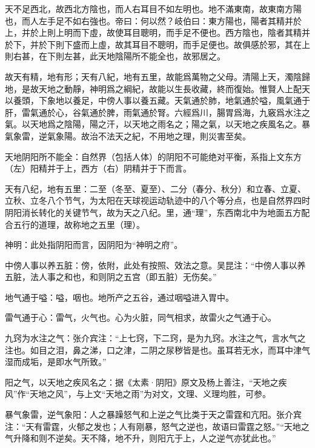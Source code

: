 \documentclass[12pt]{ctexbook}
\begin{document}

\begin{yuanwen}
天不足西北，故西北方陰也，而人右耳目不如左明也。地不滿東南，故東南方陽也，而人左手足不如右強也。帝曰：何以然？岐伯曰：東方陽也，陽者其精并於上，并於上則上明而下虛，故使耳目聰明，而手足不便也。西方陰也，陰者其精并於下，并於下則下盛而上虛，故其耳目不聰明，而手足便也。故俱感於邪，其在上則右甚，在下則左甚，此天地陰陽所不能全也，故邪居之。

故天有精，地有形；天有八紀，地有五里，故能爲萬物之父母。清陽上天，濁陰歸地，是故天地之動靜，神明爲之綱紀，故能以生長收藏，終而復始。惟賢人上配天以養頭，下象地以養足，中傍人事以養五藏。天氣通於肺，地氣通於嗌，風氣通于肝，雷氣通於心，谷氣通於脾，雨氣通於腎。六經爲川，腸胃爲海，九竅爲水注之氣。以天地爲之陰陽，陽之汗，以天地之雨名之；陽之氣，以天地之疾風名之。暴氣象雷，逆氣象陽。故治不法天之紀，不用地之理，則災害至矣。
\end{yuanwen}


\begin{jiaozhu}
  \item 天地阴阳所不能全：自然界（包括人体）的阴阳不可能绝对平衡，系指上文东方（左）阳精并于上，西方（右）阴精并于下而言。
  \item 天有八纪，地有五里：二至（冬至、夏至）、二分（春分、秋分）和立春、立夏、立秋、立冬八个节气，为太阳在天球视运动轨迹中的八个等分点，也是自然界四时阴阳消长转化的关键节气，故为天之八纪。里，通“理”，东西南北中为地面五方配合五行的道理，故称地之五里（理）。
  \item 神明：此处指阴阳而言，因阴阳为“神明之府”。
  \item 中傍人事以养五脏：傍，依附，此处有按照、效法之意。吴昆注：“中傍人事以养五脏，法人事之和也，和则阴之五宫（即五脏）无伤矣。”
  \item 地气通于嗌：嗌，咽也。地所产之五谷，通过咽嗌进入胃中。
  \item 雷气通于心：雷气，火气也。心为火脏，同气相求，故雷火之气通于心。
  \item 九窍为水注之气：张介宾注：“上七窍，下二窍，是为九窍。水注之气，言水气之注也。如目之泪，鼻之涕，口之津，二阴之尿秽皆是也。虽耳若无水，而耳中津气湿而成垢，是即水气所致。”
  \item 阳之气，以天地之疾风名之：据《太素·阴阳》原文及杨上善注，“天地之疾风”作“天地之风”，与上文“天地之雨”为对文，文理、义理均胜，可参。
  \item 暴气象雷，逆气象阳：人之暴躁怒气和上逆之气比类于天之雷霆和亢阳。张介宾注：“天有雷霆，火郁之发也；人有刚暴，怒气之逆也，故语曰雷霆之怒。”“天地之气升降和则不逆矣。天不降，地不升，则阳亢于上，人之逆气亦犹此也。”
\end{jiaozhu}
\end{document}
